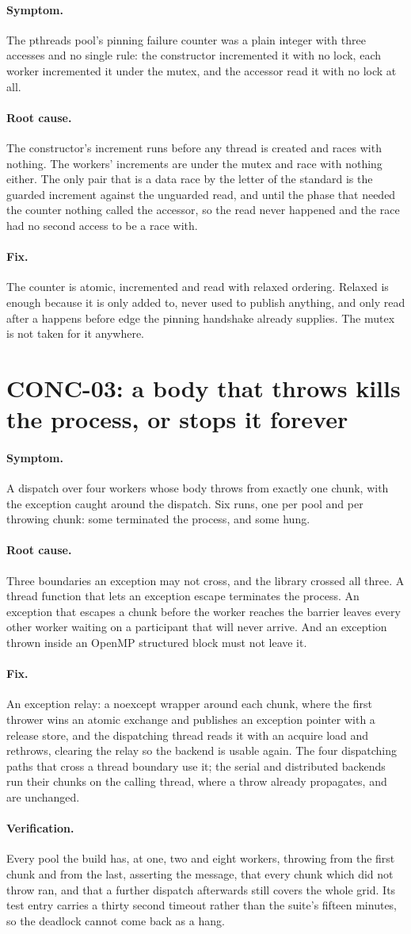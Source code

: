 \documentclass[11pt,a4paper]{report}
\newcommand{\symptom}[1]{\paragraph{Symptom.}#1}
\newcommand{\rootcause}[1]{\paragraph{Root cause.}#1}
\newcommand{\fix}[1]{\paragraph{Fix.}#1}
\newcommand{\verification}[1]{\paragraph{Verification.}#1}
\begin{document}
\symptom{The pthreads pool's pinning failure counter was a plain integer with
three accesses and no single rule: the constructor incremented it with no lock,
each worker incremented it under the mutex, and the accessor read it with no lock
at all.}

\rootcause{The constructor's increment runs before any thread is created and
races with nothing. The workers' increments are under the mutex and race with
nothing either. The only pair that is a data race by the letter of the standard
is the guarded increment against the unguarded read, and until the phase that
needed the counter nothing called the accessor, so the read never happened and
the race had no second access to be a race with.}

\fix{The counter is atomic, incremented and read with relaxed ordering. Relaxed
is enough because it is only added to, never used to publish anything, and only
read after a happens before edge the pinning handshake already supplies. The
mutex is not taken for it anywhere.}

\section{CONC-03: a body that throws kills the process, or stops it forever}

\symptom{A dispatch over four workers whose body throws from exactly one chunk,
with the exception caught around the dispatch. Six runs, one per pool and per
throwing chunk: some terminated the process, and some hung.}

\rootcause{Three boundaries an exception may not cross, and the library crossed
all three. A thread function that lets an exception escape terminates the
process. An exception that escapes a chunk before the worker reaches the barrier
leaves every other worker waiting on a participant that will never arrive. And an
exception thrown inside an OpenMP structured block must not leave it.}

\fix{An exception relay: a noexcept wrapper around each chunk, where the first
thrower wins an atomic exchange and publishes an exception pointer with a release
store, and the dispatching thread reads it with an acquire load and rethrows,
clearing the relay so the backend is usable again. The four dispatching paths
that cross a thread boundary use it; the serial and distributed backends run
their chunks on the calling thread, where a throw already propagates, and are
unchanged.}

\verification{Every pool the build has, at one, two and eight workers, throwing
from the first chunk and from the last, asserting the message, that every chunk
which did not throw ran, and that a further dispatch afterwards still covers the
whole grid. Its test entry carries a thirty second timeout rather than the
suite's fifteen minutes, so the deadlock cannot come back as a hang.}
\end{document}
